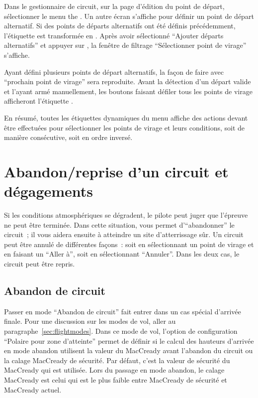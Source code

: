 Dans le gestionnaire de circuit, sur la page d'édition du point de départ, sélectionner le menu the . Un autre écran s'affiche pour définir un point de départ alternatif. Si des points de départs alternatifs
ont été définis précédemment, l'étiquette  est transformée en . Après avoir sélectionné ``Ajouter départs alternatifs''
et appuyer sur , la fenêtre de filtrage ``Sélectionner point de virage'' s'affiche.

Ayant défini plusieurs points de départ alternatifs, la façon de faire avec ``prochain point de virage'' sera reproduite. Avant la détection d'un départ valide et l'ayant armé manuellement, les boutons faisant défiler tous les points de virage afficheront l'étiquette .

En résumé, toutes les étiquettes dynamiques du menu  affiche des actions devant être
effectuées pour sélectionner les points de virage et leurs conditions, soit de manière consécutive, soit en ordre inversé.


\section{Abandon/reprise d'un circuit et dégagements}

Si les conditions atmosphériques se dégradent, le pilote peut juger que l'épreuve ne peut être terminée. Dans cette situation, \xc{} vous permet d'``abandonner'' le circuit~; il vous aidera
ensuite à atteindre un site d'atterrissage sûr. Un circuit peut être annulé de
différentes façons~: soit en sélectionnant un point de virage et en faisant un ``Aller à'', soit en sélectionnant ``Annuler''. Dans les deux cas, le circuit peut être repris.

\subsection*{Abandon de circuit}\label{sec:taskabort}
Passer en mode ``Abandon de circuit'' fait entrer \xc{} dans un cas spécial d'arrivée finale.
 Pour une discussion sur 
les modes de vol, aller au paragraphe~\ref{sec:flightmodes}. Dans ce mode de vol,
l'option de configuration ``Polaire pour zone d'atteinte'' permet de définir si
le calcul des hauteurs d'arrivée en mode abandon utilisent la valeur du MacCready avant
l'abandon du circuit ou la calage MacCready de sécurité. 
Par défaut, c'est la valeur de sécurité du MacCready qui est utilisée. Lors du passage en mode abandon, le calage MacCready est celui qui est le plus faible entre MacCready de sécurité et MacCready actuel.

